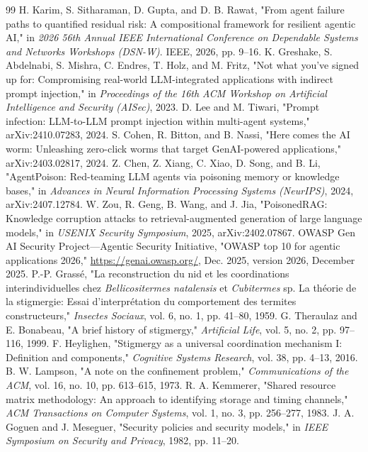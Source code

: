\documentclass[conference]{IEEEtran}
\begin{document}
\begin{thebibliography}{99}
 H. Karim, S. Sitharaman, D. Gupta, and D. B. Rawat, "From agent failure paths to quantified residual risk: A compositional framework for resilient agentic AI," in \textit{2026 56th Annual IEEE International Conference on Dependable Systems and Networks Workshops (DSN-W)}. IEEE, 2026, pp. 9--16.
 K. Greshake, S. Abdelnabi, S. Mishra, C. Endres, T. Holz, and M. Fritz, "Not what you've signed up for: Compromising real-world LLM-integrated applications with indirect prompt injection," in \textit{Proceedings of the 16th ACM Workshop on Artificial Intelligence and Security (AISec)}, 2023.
 D. Lee and M. Tiwari, "Prompt infection: LLM-to-LLM prompt injection within multi-agent systems," arXiv:2410.07283, 2024.
 S. Cohen, R. Bitton, and B. Nassi, "Here comes the AI worm: Unleashing zero-click worms that target GenAI-powered applications," arXiv:2403.02817, 2024.
 Z. Chen, Z. Xiang, C. Xiao, D. Song, and B. Li, "AgentPoison: Red-teaming LLM agents via poisoning memory or knowledge bases," in \textit{Advances in Neural Information Processing Systems (NeurIPS)}, 2024, arXiv:2407.12784.
 W. Zou, R. Geng, B. Wang, and J. Jia, "PoisonedRAG: Knowledge corruption attacks to retrieval-augmented generation of large language models," in \textit{USENIX Security Symposium}, 2025, arXiv:2402.07867.
 OWASP Gen AI Security Project---Agentic Security Initiative, "OWASP top 10 for agentic applications 2026," \url{https://genai.owasp.org/}, Dec. 2025, version 2026, December 2025.
 P.-P. Grassé, "La reconstruction du nid et les coordinations interindividuelles chez \textit{Bellicositermes natalensis} et \textit{Cubitermes} sp. La théorie de la stigmergie: Essai d'interprétation du comportement des termites constructeurs," \textit{Insectes Sociaux}, vol. 6, no. 1, pp. 41--80, 1959.
 G. Theraulaz and E. Bonabeau, "A brief history of stigmergy," \textit{Artificial Life}, vol. 5, no. 2, pp. 97--116, 1999.
 F. Heylighen, "Stigmergy as a universal coordination mechanism I: Definition and components," \textit{Cognitive Systems Research}, vol. 38, pp. 4--13, 2016.
 B. W. Lampson, "A note on the confinement problem," \textit{Communications of the ACM}, vol. 16, no. 10, pp. 613--615, 1973.
 R. A. Kemmerer, "Shared resource matrix methodology: An approach to identifying storage and timing channels," \textit{ACM Transactions on Computer Systems}, vol. 1, no. 3, pp. 256--277, 1983.
 J. A. Goguen and J. Meseguer, "Security policies and security models," in \textit{IEEE Symposium on Security and Privacy}, 1982, pp. 11--20.

\end{thebibliography}
\end{document}
